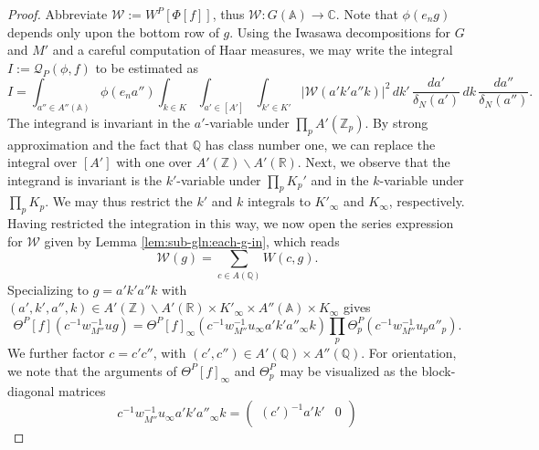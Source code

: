 \documentclass[reqno]{amsart}
\theoremstyle{plain} \newtheorem{theorem} {Theorem}
\theoremstyle{definition} \newtheorem{definition} [theorem] {Definition}
\theoremstyle{itplain} %
\numberwithin{equation}{section}
\numberwithin{theorem}{section}
\begin{document}
\begin{proof}
  Abbreviate $\mathcal{W} := W^P[\Phi[f]]$, thus $\mathcal{W} : G(\mathbb{A}) \rightarrow \mathbb{C}$.  Note that $\phi(e_n g)$ depends only upon the bottom row of $g$.  Using the Iwasawa decompositions for $G$ and $M'$ and a careful computation of Haar measures, we may write the integral $I := \mathcal{Q}_P(\phi,f)$ to be estimated as
\begin{equation*}
  I = \int _{a'' \in A''(\mathbb{A})}
  \phi(e_n a'')
  \int _{k \in K}
  \int _{a' \in [A']}
  \int _{k' \in K'}
  |\mathcal{W}(a' k' a'' k)|^2
  \, d k' \, \frac{d a'}{\delta_N(a')}
  \, d k \, \frac{d a''}{\delta_N(a'')}.
\end{equation*}
The integrand is invariant in the $a'$-variable under $\prod_p A'(\mathbb{Z}_p)$.  By strong approximation and the fact that $\mathbb{Q}$ has class number one, we can replace the integral over $[A']$ with one over $A'(\mathbb{Z}) \backslash A'(\mathbb{R})$.  Next, we observe that the integrand is invariant is the $k'$-variable under $\prod_p K_p'$ and in the $k$-variable under $\prod_p K_p$.  We may thus restrict the $k'$ and $k$ integrals to $K'_\infty$ and $K_\infty$, respectively.  Having restricted the integration in this way, we now open the series expression for $\mathcal{W}$ given by Lemma \ref{lem:sub-gln:each-g-in}, which reads
\begin{equation*}
\mathcal{W}(g) = \sum _{c \in A(\mathbb{Q})} W(c,g).
\end{equation*}
 Specializing to $g = a' k' a'' k$ with $(a',k',a'',k) \in A'(\mathbb{Z}) \backslash A'(\mathbb{R}) \times K'_\infty \times A''(\mathbb{A}) \times K_\infty$ gives
\begin{equation*}
  \Theta^P[f](c^{-1} w_{M''}^{-1} u g)
  =
  \Theta^P[f]_\infty(c^{-1} w_{M''}^{-1} u_\infty a' k' a''_\infty k)
  \prod_{p}
  \Theta^P_p(c^{-1} w_{M''}^{-1} u_p a''_p).
\end{equation*}
We further factor $c = c' c''$, with $(c', c'') \in A'(\mathbb{Q}) \times A''(\mathbb{Q})$.  For orientation, we note that the arguments of $\Theta^P[f]_\infty$ and $\Theta_p^P$ may be visualized as the block-diagonal matrices
\begin{equation*}
  c^{-1} w_{M''}^{-1} u_\infty a' k' a''_\infty k
  =
  \begin{pmatrix}
    (c')^{-1} a' k' & 0 \\

\end{pmatrix}
\end{equation*}
\end{proof}
\end{document}
